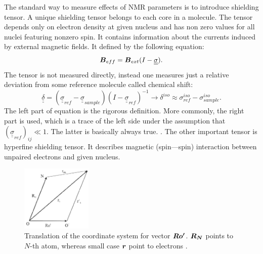 \documentclass[openany, longbibliography,slovene,a4paper,12pt]{article}
\def\vec#1{\mbox{\boldmath$#1$}}
\begin{document}
The standard way to measure effects of NMR parameters is to introduce shielding
tensor. A unique shielding tensor belongs to each core in a molecule. The tensor
depends only on electron density at given nucleus and has non zero values for
all nuclei featuring nonzero spin. It contains information about the currents
induced by external magnetic fields. It defined by the following equation:
\begin{equation}
  \vec B_{eff}=\vec B_{ext}(I-\underline{\underline{\sigma}}).
  \end{equation}
The tensor is not measured directly, instead one measures just a relative
deviation from some reference molecule called chemical shift:
\begin{equation}
  \underline{\underline{\delta}}= ( \underline{\underline{\sigma}}_{ref} -  \underline{\underline{\sigma}}_{sample})  (I-\underline{\underline{\sigma}}_{ref})^{-1}  \rightarrow \delta ^{iso}\approx \sigma^{iso}_{ref} -  \sigma^{iso}_{sample}.
\end{equation}
The left part of equation is the rigorous definition. More commonly, the right
part is used, which is a trace of the left side under the assumption that
$(\underline{\underline{\sigma}}_{ref})_{ij} \ll 1$. The latter is basically
always true.
.
The other important tensor is hyperfine shielding tensor. It describes magnetic
(spin---spin) interaction between unpaired electrons and given nucleus.
\begin{figure}
\centering
\includegraphics[width=0.3\textwidth]{origin_dependance_tensor.png}
\caption{Translation of the coordinate system for vector $\vec{Ro'}$. $\vec{R_N}$
  points to $N$-th atom, whereas small case $\vec r$ point to electrons  \cite{chemic_shift_tensor_review}.}
\end{figure}
\end{document}
